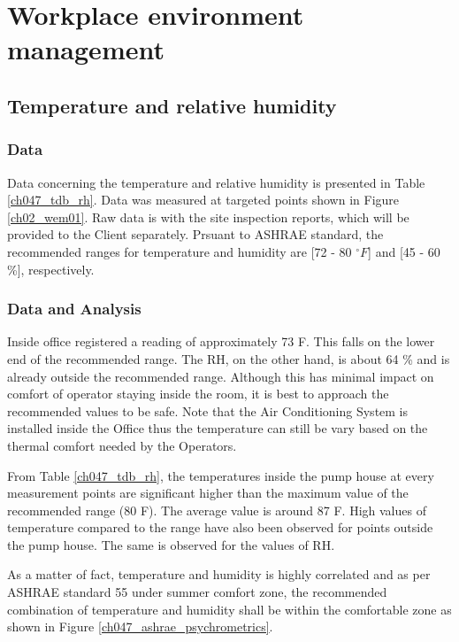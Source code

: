 
\section{Workplace environment management}
\label{47}

\subsection{Temperature and relative humidity}
\subsubsection{Data}
Data concerning the temperature and relative humidity is presented in Table \ref{ch047_tdb_rh}. Data was measured at targeted points shown in Figure \ref{ch02_wem01}. Raw data is with the site inspection reports, which will be provided to the Client separately. Prsuant to ASHRAE standard, the recommended ranges for temperature and humidity are [72 - 80 $^\circ F$] and [45 - 60 \%], respectively.

\subsubsection{Data and Analysis}



Inside office registered a reading of approximately 73 F. This falls on the lower end of the recommended range. The RH, on the other hand, is about 64 \% and is already outside the recommended range. Although this has minimal impact on comfort of operator staying inside the room, it is best to approach the recommended values to be safe. Note that the Air Conditioning System is installed inside the Office thus the temperature can still be vary based on the thermal comfort needed by the Operators.

From Table \ref{ch047_tdb_rh}, the temperatures inside the pump house at every measurement points are significant higher than the maximum value of the recommended range (80 F). The average value is around 87 F. High values of temperature compared to the range have also been observed for points outside the pump house. The same is observed for the values of RH.

As a matter of fact, temperature and humidity is highly correlated and as per ASHRAE standard 55 under summer comfort zone, the recommended combination of temperature and humidity shall be within the comfortable zone as shown in Figure \ref{ch047_ashrae_psychrometrics}.

